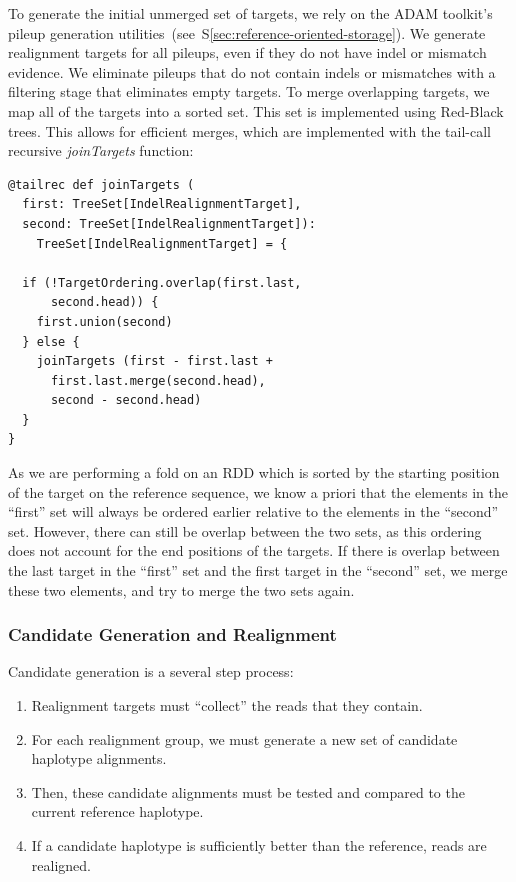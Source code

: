 \documentclass[masters]{ucbthesis}
\begin{document}
To generate the initial unmerged set of targets, we rely on the ADAM toolkit's pileup generation utilities~(see~\-S\ref{sec:reference-oriented-storage}).
We generate realignment targets for all pileups, even if they do not have indel or mismatch evidence. We eliminate pileups that do not contain indels
or mismatches with a filtering stage that eliminates empty targets. To merge overlapping targets, we map all of the targets into a sorted set. This set
is implemented using Red-Black trees. This allows for efficient merges, which are implemented with the tail-call recursive \emph{joinTargets} function:

\begin{lstlisting}
@tailrec def joinTargets (                                                                                                                                                               
  first: TreeSet[IndelRealignmentTarget],                                                                                                                                                                
  second: TreeSet[IndelRealignmentTarget]):
    TreeSet[IndelRealignmentTarget] = {

  if (!TargetOrdering.overlap(first.last,
      second.head)) {
    first.union(second)
  } else {
    joinTargets (first - first.last +
      first.last.merge(second.head),
      second - second.head)
  }
}
\end{lstlisting}

As we are performing a fold on an RDD which is sorted by the starting position of the target on the reference sequence, we know a priori that the elements
in the ``first'' set will always be ordered earlier relative to the elements in the ``second'' set. However, there can still be overlap between the two sets, as this
ordering does not account for the end positions of the targets. If there is overlap between the last target in the ``first'' set and the first target in the ``second''
set, we merge these two elements, and try to merge the two sets again.

\subsubsection{Candidate Generation and Realignment}
\label{sec:candidate-generation-realignment}

Candidate generation is a several step process:

\begin{enumerate}
\item Realignment targets must ``collect'' the reads that they contain.
\item For each realignment group, we must generate a new set of candidate haplotype alignments.
\item Then, these candidate alignments must be tested and compared to the current reference haplotype.
\item If a candidate haplotype is sufficiently better than the reference, reads are realigned.
\end{enumerate}
\end{document}
